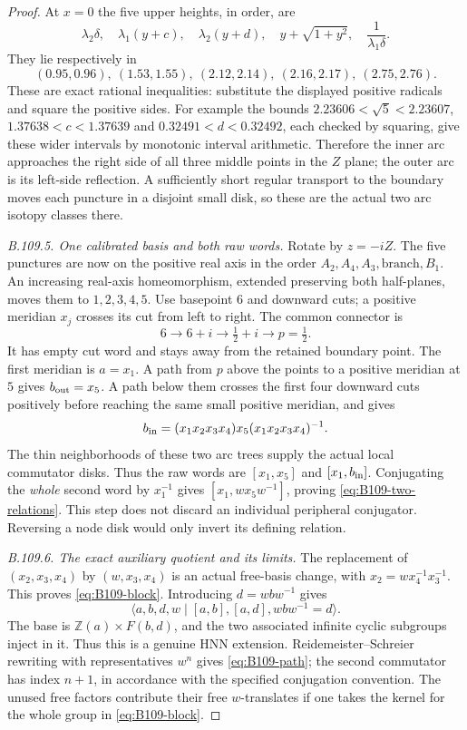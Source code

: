\begin{proof}
At $x=0$ the five upper heights, in order, are
\[
 \lambda_2\delta,\quad \lambda_1(y+c),\quad
 \lambda_2(y+d),\quad y+\sqrt{1+y^2},\quad
 \frac1{\lambda_1\delta}.
\]
They lie respectively in
\[
 (0.95,0.96),\ (1.53,1.55),\ (2.12,2.14),\
 (2.16,2.17),\ (2.75,2.76).
\]
These are exact rational inequalities: substitute the displayed
positive radicals and square the positive sides. For example the
bounds $2.23606<\sqrt5<2.23607$,
$1.37638<c<1.37639$ and $0.32491<d<0.32492$, each checked by
squaring, give these wider intervals by monotonic interval
arithmetic. Therefore the inner arc approaches the right side
of all three middle points in the $Z$ plane; the outer arc is
its left-side reflection. A sufficiently short regular transport
to the boundary moves each puncture in a disjoint small disk,
so these are the actual two arc isotopy classes there.

\emph{B.109.5. One calibrated basis and both raw words.}
Rotate by $z=-iZ$. The five punctures are now on the positive real
axis in the order $A_2,A_4,A_3,\text{branch},B_1$. An increasing
real-axis homeomorphism, extended preserving both half-planes,
moves them to $1,2,3,4,5$. Use basepoint $6$ and downward cuts;
a positive meridian $x_j$ crosses its cut from left to right.
The common connector is
\[
 6\longrightarrow6+i\longrightarrow\tfrac12+i
      \longrightarrow p=\tfrac12.
\]
It has empty cut word and stays away from the retained boundary
point. The first meridian is $a=x_1$. A path from $p$ above the
points to a positive meridian at $5$ gives $b_{\rm out}=x_5$.
A path below them crosses the first four downward cuts positively
before reaching the same small positive meridian, and gives
\[
 b_{\rm in}=(x_1x_2x_3x_4)x_5(x_1x_2x_3x_4)^{-1}.
\]
The thin neighborhoods of these two arc trees supply the actual
local commutator disks. Thus the raw words are $[x_1,x_5]$ and
$[x_1,b_{\rm in}]$. Conjugating the \emph{whole} second word by
$x_1^{-1}$ gives $[x_1,wx_5w^{-1}]$, proving
\eqref{eq:B109-two-relations}. This step does not discard an
individual peripheral conjugator. Reversing a node disk would
only invert its defining relation.

\emph{B.109.6. The exact auxiliary quotient and its limits.}
The replacement of $(x_2,x_3,x_4)$ by $(w,x_3,x_4)$ is an actual
free-basis change, with $x_2=wx_4^{-1}x_3^{-1}$. This proves
\eqref{eq:B109-block}. Introducing $d=wbw^{-1}$ gives
\[
 \langle a,b,d,w\mid[a,b],[a,d],wbw^{-1}=d\rangle.
\]
The base is $\mathbb Z(a)\times F(b,d)$, and the two associated
infinite cyclic subgroups inject in it. Thus this is a genuine
HNN extension. Reidemeister--Schreier rewriting with representatives
$w^n$ gives \eqref{eq:B109-path}; the second commutator has index
$n+1$, in accordance with the specified conjugation convention.
The unused free factors contribute their free $w$-translates if
one takes the kernel for the whole group in
\eqref{eq:B109-block}.


\end{proof}
